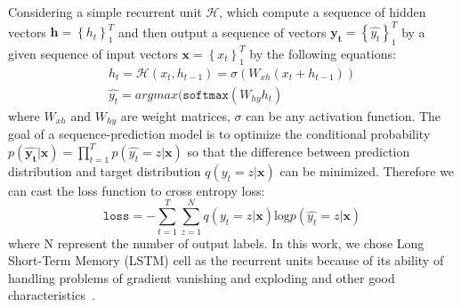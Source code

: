 \documentclass[11pt,letterpaper]{article}
\begin{document}
Considering a simple recurrent unit $\mathcal{H}$, which compute a sequence of hidden vectors $\mathbf{h}=\left\{ h_t\right\}^T_1$ and then output a sequence of vectors $\mathbf{\hat{y_t}}=\left\{\hat{y_t}\right\}^T_1$ by a  given sequence of input vectors $\mathbf{x}=\left\{ x_t\right\}^T_1$ by the following equations:
\begin{gather*}
h_t = \mathcal{H}(x_t, h_{t-1}) = \sigma(W_{xh}(x_t + h_{t-1})) \\
\hat{y_t} = arg max (\mathtt{softmax}(W_{hy}h_t)
\end{gather*}
where $W_{xh}$ and $W_{hy}$ are weight matrices, $\sigma$ can be any activation function.
The goal of a sequence-prediction model is to optimize the conditional probability $p(\mathbf{\hat{y_t}}|\mathbf{x})=\prod^T_{t=1}p(\hat{y_t}=z|\mathbf{x})$ so that the difference between prediction distribution and target distribution $q(y_t=z|\mathbf{x})$ can be minimized. Therefore we can cast the loss function to cross entropy loss:
\begin{equation*}
\mathtt{loss} = -\sum_{t=1}^{T}\sum_{z=1}^{N}q(y_t=z|\mathbf{x}) \mathrm{log} p(\hat{y_t}=z|\mathbf{x})
\end{equation*}
where N represent the number of output labels. In this work, we chose Long Short-Term Memory (LSTM) cell as the recurrent units because of its ability of handling problems of gradient vanishing and exploding and other good characteristics~\cite{}.
\end{document}

